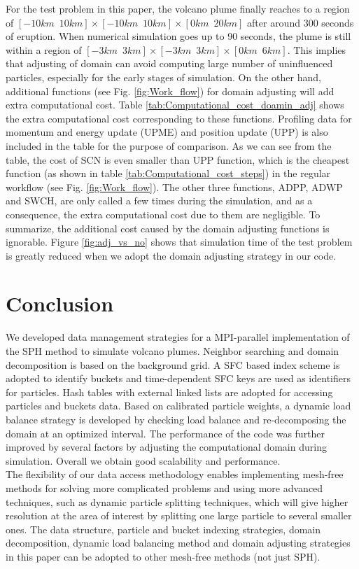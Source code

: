 For the test problem in this paper, the volcano plume finally reaches to a region of $[-10km \,\,\, 10km] \times [-10km\,\,\,10km] \times [0km\,\,\,20km]$ after around 300 seconds of eruption. When numerical simulation goes up to 90 seconds, the plume is still within a region of $[-3km\,\,\,3km] \times [-3km\,\,\,3km] \times [0km\,\,\,6km]$. This implies that adjusting of domain can avoid computing large number of uninfluenced particles, especially for the early stages of simulation. On the other hand, additional functions (see Fig. \ref{fig:Work_flow}) for domain adjusting will add extra computational cost. Table \ref{tab:Computational_cost_doamin_adj} shows the extra computational cost corresponding to these functions. Profiling data for momentum and energy update (UPME) and position update (UPP) is also included in the table for the purpose of comparison. As we can see from the table, the cost of SCN is even smaller than UPP function, which is the cheapest function (as shown in table \ref{tab:Computational_cost_steps}) in the regular workflow (see Fig. \ref{fig:Work_flow}). The other three functions, ADPP, ADWP and SWCH, are only called a few times during the simulation, and as a consequence, the extra computational cost due to them are negligible. To summarize, the additional cost caused by the domain adjusting functions is ignorable.
Figure \ref{fig:adj_vs_no} shows that simulation time of the test problem is greatly reduced when we adopt the domain adjusting strategy in our code.
\section{Conclusion}
We developed data management strategies for a MPI-parallel implementation of the SPH method to simulate volcano plumes. Neighbor searching and domain decomposition is based on the background grid. A SFC based index scheme is adopted to identify buckets and time-dependent SFC keys are used as identifiers for particles. 
Hash tables with external linked lists are adopted for accessing particles and buckets data. Based on calibrated particle weights, a dynamic load balance strategy is developed by checking load balance and re-decomposing the domain at an optimized interval. The performance of the code was further improved by several factors by adjusting the computational domain during simulation.
Overall we obtain good scalability and performance.\\
The flexibility of our data access methodology enables implementing mesh-free methods for solving more complicated problems and using more advanced techniques, such as dynamic particle splitting techniques\cite{vacondio2012accurate, feldman2007dynamic}, which will give higher resolution at the area of interest by splitting one large particle to several smaller ones. The data structure, particle and bucket indexing strategies, domain decomposition, dynamic load balancing method and domain adjusting strategies in this paper can be adopted to other mesh-free methods (not just SPH).
